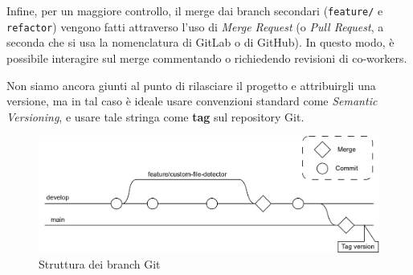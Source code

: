 Infine, per un maggiore controllo, il merge dai branch secondari (\texttt{feature/} e \texttt{refactor}) vengono fatti attraverso l'uso di \emph{Merge Request} (o \emph{Pull Request}, a seconda che si usa la nomenclatura di GitLab o di GitHub).
In questo modo, è possibile interagire sul merge commentando o richiedendo revisioni di co-workers.

Non siamo ancora giunti al punto di rilasciare il progetto e attribuirgli una versione, ma in tal caso è ideale usare convenzioni standard come \emph{Semantic Versioning}, e usare tale stringa come \textbf{tag} sul repository Git.

\begin{figure}[h!]
    \centering
    \includegraphics[width=\textwidth]{assets/git_branches_diagram.png}
    \caption{Struttura dei branch Git}
    \label{fig:git_branches_diagram}
\end{figure}